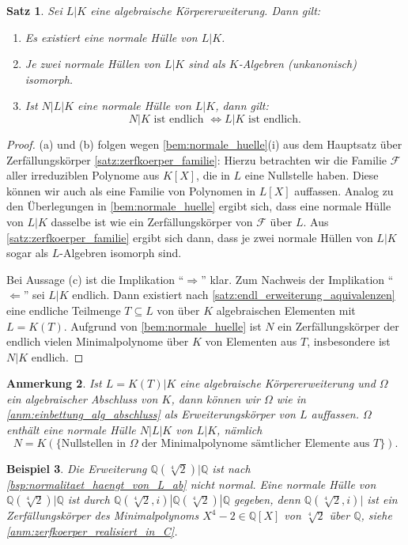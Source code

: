 \documentclass[a4paper, twoside, 11pt, ngerman]{report}
\newcommand{\QQ}{\mathds Q}
\newcommand{\calF}{\mathcal F}
\theoremstyle{definistyle}
\newtheorem{satz}{Satz}[section]
\newtheorem{anm}[satz]{Anmerkung}
\newtheorem{bsp}[satz]{Beispiel}
\theoremstyle{remark}
\begin{document}
\begin{satz}\label{satz:normale_huelle_existenz}
Sei $L|K$ eine algebraische Körpererweiterung. Dann gilt:
\begin{enumerate}[label=(\alph*)]
\item Es existiert eine normale Hülle von $L|K$.
\item Je zwei normale Hüllen von $L|K$ sind als $K$-Algebren (unkanonisch) isomorph.
\item Ist $N|L|K$ eine normale Hülle von $L|K$, dann gilt: \[N|K \text{ ist endlich } \iff L|K \text{ ist endlich.}\]
\end{enumerate}
\end{satz}

\begin{proof}
(a) und (b) folgen wegen \ref{bem:normale_huelle}(i) aus dem  Hauptsatz über Zerfällungskörper \ref{satz:zerfkoerper_familie}: Hierzu betrachten wir die Familie $\calF$ aller irreduziblen Polynome aus $K[X]$, die in $L$ eine Nullstelle haben. Diese können wir auch als eine Familie von Polynomen in $L[X]$ auffassen. Analog zu den Überlegungen in \ref{bem:normale_huelle}
ergibt sich, dass eine normale Hülle von $L|K$ dasselbe ist wie ein Zerfällungskörper von $\calF$ über $L$. Aus \ref{satz:zerfkoerper_familie} ergibt sich dann, dass je zwei normale Hüllen von $L|K$ sogar als $L$-Algebren isomorph sind.

Bei Aussage (c) ist die Implikation "`$\Rightarrow$"' klar. Zum Nachweis der
Implikation "`$\Leftarrow$"' sei $L|K$ endlich. Dann existiert nach \ref{satz:endl_erweiterung_aquivalenzen} eine endliche Teilmenge $T \subseteq L$ von über $K$ algebraischen Elementen mit $L=K(T)$. Aufgrund von \ref{bem:normale_huelle} ist $N$ ein Zerfällungskörper der endlich vielen Minimalpolynome über $K$ von Elementen aus $T$, insbesondere ist $N|K$ endlich.
\end{proof}

\begin{anm}\label{anm:normale_huelle_realisierung}
Ist $L=K(T)|K$ eine algebraische Körpererweiterung und $\Omega$ ein algebraischer Abschluss von $K$, dann können wir $\Omega$ wie in \ref{anm:einbettung_alg_abschluss} als Erweiterungskörper von $L$ auffassen. $\Omega$ enthält eine normale Hülle $N|L|K$ von $L|K$, nämlich 
\[
N=K(\{\text{Nullstellen in }\Omega \text{ der Minimalpolynome sämtlicher Elemente aus } T\}). 
\]
\end{anm}

\begin{bsp}\label{bsp:normale_huelle}
Die Erweiterung $\QQ(\sqrt[4]{2})|\QQ$ ist nach \ref{bsp:normalitaet_haengt_von_L_ab}
nicht normal. Eine normale Hülle von $\QQ(\sqrt[4]{2})|\QQ$ ist durch $\QQ(\sqrt[4]{2},i)|\QQ(\sqrt[4]{2})|\QQ$ gegeben, denn $\QQ(\sqrt[4]{2},i)|$ ist ein Zerfällungskörper des Minimalpolynoms $X^4-2\in\QQ[X]$ von $\sqrt[4]{2}$ über $\QQ$, siehe \ref{anm:zerfkoerper_realisiert_in_C}. 
\end{bsp}
\end{document}
